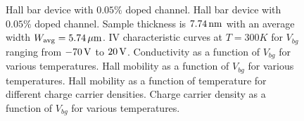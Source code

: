 \begin{figure}[ht]
	\qquad
	\qquad
	\caption[Hall measurement data for $0.05\%$  doped  channel]{\protect{} Hall bar device with $0.05\%$  doped  channel. Hall bar device with $0.05\%$  doped  channel. Sample thickness is $7.74\,\mathrm{nm}$ with an average width $W_\mathrm{avg}=5.74\,\mathrm{\mu m}$. \protect{} IV characteristic curves at $T=300K$ for $V_{bg}$ ranging from $-70\,\mathrm{V}$ to $20\,\mathrm{V}$. \protect{} Conductivity as a function of $V_{bg}$ for various temperatures. \protect{} Hall mobility as a function of $V_{bg}$ for various temperatures. \protect{} Hall mobility as a function of temperature for different charge carrier densities. \protect{} Charge carrier density as a function of $V_{bg}$ for various temperatures.}
	\label{fig:hall_measurement_data1}
\end{figure}

